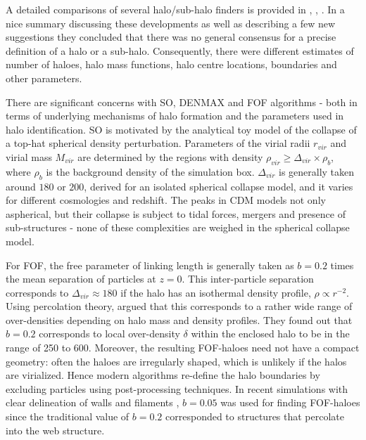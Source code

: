 
A detailed comparisons of several halo/sub-halo finders is provided in \cite{Knebe2011a}, \cite{Knebe2013}, \cite{Onions2012}. In a nice summary discussing  these developments as well as describing a few new suggestions they  concluded that there was no general consensus for a precise definition of a halo or a sub-halo. Consequently, there were different estimates of number of haloes, halo mass functions, halo centre locations, boundaries and other parameters. 



There are significant concerns with SO, DENMAX and FOF algorithms - both in terms of underlying mechanisms of halo formation and the parameters used in halo identification. SO is motivated by the analytical toy model of the collapse of a top-hat spherical density perturbation. Parameters of the virial radii $r_{vir}$ and virial mass $M_{vir}$ are determined by the regions with density $\rho_{vir} \geq \Delta_{vir} \times \rho_b$, where $\rho_b$ is the background density of the simulation box. $\Delta_{vir}$ is generally taken around $180$ or $200$, derived for an isolated spherical collapse model, and it varies for different cosmologies and redshift. The peaks in CDM models  not only aspherical, but their collapse is subject to tidal forces, mergers and presence of sub-structures - none of these complexities are weighed in the spherical collapse model. 


For FOF, the free parameter of linking length is generally taken as $b = 0.2$ times the mean separation of particles at $z=0$. This inter-particle separation corresponds to $\Delta_{vir} \approx 180$ if the halo has an isothermal density profile, $\rho \propto r^{-2}$. Using percolation theory, \cite{More2011} argued that this corresponds to a rather wide range of over-densities depending on halo mass and density profiles. They found out that $b = 0.2$ corresponds to local over-density $\delta$ within the enclosed halo to be in the range of 250 to 600. Moreover, the resulting FOF-haloes need not have a compact geometry: often the haloes are irregularly shaped, which is unlikely if the halos are virialized.
Hence modern algorithms re-define the halo boundaries by excluding particles using post-processing techniques. In recent simulations with clear delineation of walls and filaments \cite{Angulo2013a}, $b=0.05$ was used for finding FOF-haloes since the traditional value of $b = 0.2$ corresponded to structures that percolate into the web structure.

